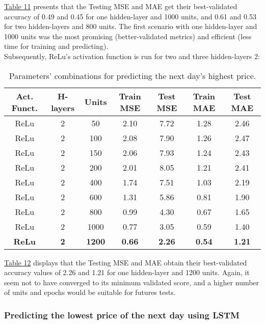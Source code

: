 \hyperref[table:Results for LSTM, Tanh, High]{Table 11} presents that the Testing MSE and MAE get their best-validated accuracy of 0.49 and 0.45 for one hidden-layer and 1000 units, and 0.61 and 0.53 for two hidden-layers and 800 units. The first scenario with one hidden-layer and 1000 units was the most promising (better-validated metrics) and efficient (less time for training and predicting).\\

Subsequently, ReLu's activation function is run for two and three hidden-layers 2:

\begin{table}[H]
\centering
\begin{tabular}{ |c|c|c|c|c|c|c| }
\hline
\textbf{Act. Funct.} & \textbf{H-layers} & \textbf{Units} & \textbf{Train MSE} & \textbf{Test MSE} & \textbf{Train MAE} & \textbf{Test MAE}\\
\hline
ReLu & 2 & 50 & 2.10 &	7.72 &	1.28 &	2.46\\
ReLu & 2 & 100 & 2.08 &	7.90 &	1.26 &	2.47\\
ReLu & 2 & 150 & 2.06 &	7.93 &	1.24 &	2.43\\
ReLu & 2 & 200 & 2.01 &	8.05 &	1.21 &	2.41\\
ReLu & 2 & 400 & 1.74 &	7.51 &	1.03 &	2.19\\
ReLu & 2 & 600 & 1.31 &	5.86 &	0.81 &	1.90\\
ReLu & 2 & 800 & 0.99 &	4.30 &	0.67 &	1.65\\
ReLu & 2 & 1000 & 0.77 &	3.05 &	0.59 &	1.40\\
\rowcolor{lightgray} \textbf{ReLu} & \textbf{2} & \textbf{1200} & \textbf{0.66} &	\textbf{2.26} &	\textbf{0.54} &	\textbf{1.21}\\
\hline
\hline

\hline
\end{tabular}%
\label{table:Results for LSTM, ReLu, High}
\caption{Parameters' combinations for predicting the next day's highest price.}
\end{table}

\hyperref[table:Results for LSTM, ReLu, High]{Table 12} displays that the Testing MSE and MAE obtain their best-validated accuracy values of 2.26 and 1.21 for one hidden-layer and 1200 units. Again, it seem not to have converged to its minimum validated score, and a higher number of units and epochs would be suitable for futures tests.

\subsubsection{Predicting the lowest price of the next day using LSTM}
\label{chap:Predicting the lowest price of the next day using LSTM}

